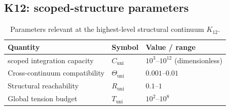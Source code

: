 
\subsection*{K12: scoped-structure parameters}

\begin{table}[htbp]
  \centering
  \caption{Parameters relevant at the highest-level structural continuum \(K_{12}\).}
  \label{tab:k12-scoped-parameters}
  \begin{tabular}{@{}L{0.44\textwidth}L{0.16\textwidth}L{0.23\textwidth}@{}}
    \hline
    Quantity & Symbol & Value / range \\
    \hline
    scoped integration capacity & \(C_\mathrm{uni}\)
        & \(10^3\text{–}10^{12}\) (dimensionless) \\
    Cross-continuum compatibility & \(\Theta_\mathrm{uni}\)
        & \(0.001\text{–}0.01\) \\
    Structural reachability & \(R_\mathrm{uni}\)
        & \(0.1\text{–}1\) \\
    Global tension budget & \(T_\mathrm{uni}\)
        & \(10^2\text{–}10^8\) \\
    \hline
  \end{tabular}
\end{table}

\endgroup
